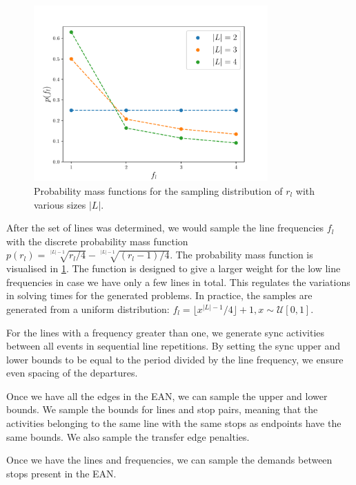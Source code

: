 \documentclass[english, 12pt, a4paper, sci, utf8, a-2b, online]{aaltothesis}
\begin{document}
\begin{figure}
    \centering
    \includegraphics[width=0.8\textwidth]{figures/generation-rl-sample-density.pdf}
    \caption{Probability mass functions for the sampling distribution of $r_l$ with various sizes $|L|$.}
    \label{fig:generation-rl-mass}
\end{figure}

After the set of lines was determined, we would sample the line frequencies $f_l$ with the discrete probability mass function $p(r_l) = \sqrt[|L| - 1]{r_l / 4} - \sqrt[|L| - 1]{(r_l - 1) / 4}$. The probability mass function is visualised in \cref{fig:generation-rl-mass}. The function is designed to give a larger weight for the low line frequencies in case we have only a few lines in total. This regulates the variations in solving times for the generated problems. In practice, the samples are generated from a uniform distribution: $f_l = \lfloor x ^{|L| - 1} / 4 \rfloor + 1, x \sim \mathcal{U}[0, 1]$.


For the lines with a frequency greater than one, we generate sync activities between all events in sequential line repetitions. By setting the sync upper and lower bounds to be equal to the period divided by the line frequency, we ensure even spacing of the departures.

Once we have all the edges in the EAN, we can sample the upper and lower bounds. We sample the bounds for lines and stop pairs, meaning that the activities belonging to the same line with the same stops as endpoints have the same bounds. We also sample the transfer edge penalties.


Once we have the lines and frequencies, we can sample the demands between stops present in the EAN. 
\end{document}
